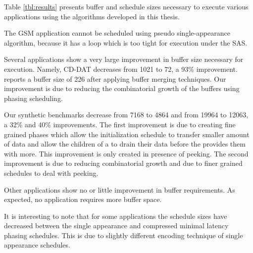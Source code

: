Table \ref{tbl:results} presents buffer and schedule sizes
necessary to execute various applications using the algorithms
developed in this thesis.

The GSM application cannot be scheduled using pseudo
single-appearance algorithm, because it has a loop which is too
tight for execution under the SAS.

Several applications show a very large improvement in buffer size
necessary for execution.  Namely, CD-DAT decreases from 1021 to
72, a 93\% improvement. \cite{murthy99buffer} reports a buffer
size of 226 after applying buffer merging techniques. Our
improvement is due to reducing the combinatorial growth of the
buffers using phasing scheduling.

Our synthetic benchmarks decrease from 7168 to 4864 and from 19964
to 12063, a 32\% and 40\% improvements. The first improvement is
due to creating fine grained phases which allow the initialization
schedule to transfer smaller amount of data and allow the children
of a {\splitjoin} to drain their data before the {\splitter}
provides them with more. This improvement is only created in
presence of peeking. The second improvement is due to reducing
combinatorial growth and due to finer grained schedules to deal
with peeking.

Other applications show no or little improvement in buffer
requirements. As expected, no application requires more buffer
space.

It is interesting to note that for some applications the schedule
sizes have decreased between the single appearance and compressed
minimal latency phasing schedules. This is due to slightly
different encoding technique of single appearance schedules.

